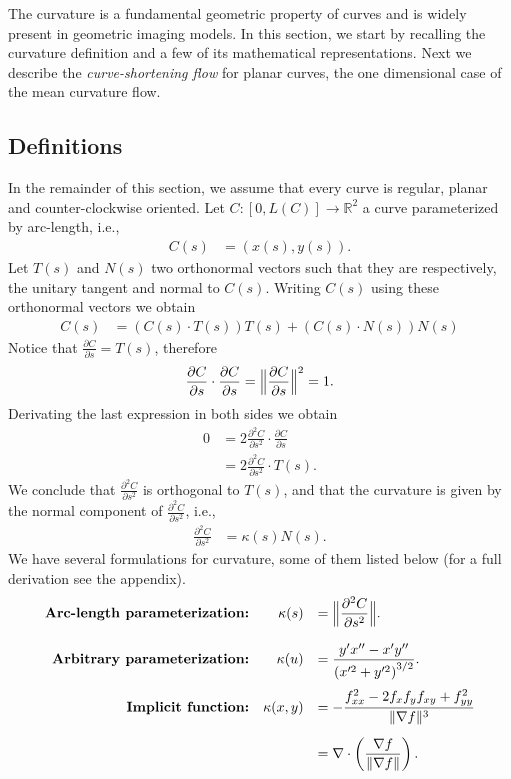 The curvature is a fundamental geometric property of curves and is widely present in geometric imaging models. In this section, we start by recalling the curvature definition and a few of its mathematical representations. Next we describe the \emph{curve-shortening flow} for planar curves, the one dimensional case of the mean curvature flow.

\subsection{Definitions}
In the remainder of this section, we assume that every curve is regular, planar and counter-clockwise oriented. Let $C:[0,L(C)]\rightarrow \mathbb{R}^2$ a curve parameterized by arc-length, i.e.,
\begin{align*}
	C(s) &= (x(s),y(s)).
\end{align*}
%
Let $T(s)$ and $N(s)$ two orthonormal vectors such that they are respectively, the unitary tangent and normal to $C(s)$. Writing $C(s)$ using these orthonormal vectors we obtain
\begin{align*}
	C(s) &= \left( C(s) \cdot T(s) \right)T(s) + \left( C(s) \cdot N(s) \right)N(s)
\end{align*}
%
Notice that $\frac{\partial C}{\partial s} = T(s)$, therefore
\begin{align*}
	\frac{\partial C}{\partial s} \cdot \frac{\partial C}{\partial s} = \Big\lVert \frac{ \partial C}{\partial s} \Big\rVert^2 = 1.
\end{align*}
%
Derivating the last expression in both sides we obtain
\begin{align*}
	0 &= 2\frac{\partial ^2 C}{\partial s^2} \cdot \frac{\partial C}{\partial s} \\
	  &= 2\frac{\partial ^2 C}{\partial s^2} \cdot T(s).
\end{align*}
%
We conclude that $\frac{\partial ^2 C}{\partial s^2}$ is orthogonal to $T(s)$, and that the curvature is given by the normal component of $\frac{\partial ^2 C}{\partial s^2}$, i.e.,
\begin{align*}
	\frac{\partial ^2 C}{\partial s^2} &= \kappa(s) N(s).
\end{align*}
%
We have several formulations for curvature, some of them listed below (for a full derivation see the appendix). 
\begin{align*}
\begin{array}{rrl}
	\textbf{Arc-length parameterization:} & \displaystyle \kappa(s) &= \displaystyle \Big\lVert \frac{\partial^2 C}{\partial s^2} \Big\rVert. \\[1.5em]	
	\textbf{Arbitrary parameterization:} & \displaystyle \kappa(u) &= \displaystyle \frac{y'x'' - x'y''}{\left( x'^2 + y'^2 \right)^{3/2}}. \\[1.5em]
	\textbf{Implicit function:} & \displaystyle \kappa(x,y) &= \displaystyle -\frac{f_{xx}^2 - 2f_xf_yf_{xy} + f_{yy}^2}{\lVert\nabla f\rVert^3} \\[1.5em]
	&&= \displaystyle \nabla \cdot \left( \frac{\nabla f}{\lVert\nabla f\rVert} \right).
\end{array}
\end{align*}
%
%


